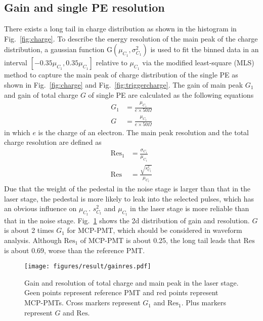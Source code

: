 \subsection{Gain and single PE resolution}
\label{sec:noisegain}
There exists a long tail in charge distribution as shown in the histogram in Fig.~\ref{fig:charge}. To describe the energy resolution of the main peak of the charge distribution, a gaussian function G$(\mu_{C_1},\sigma^2_{C_1})$ is used to fit the binned data in an interval $[-0.35\mu_{C_1}, 0.35\mu_{C_1}]$ relative to $\mu_{C_1}$ via the modified least-square (MLS) method \cite{Cowan1998StatisticalDA} to capture the main peak of charge distribution of the single PE as shown in Fig.~\ref{fig:charge} and Fig.~\ref{fig:triggercharge}. The gain of main peak $G_1$ and gain of total charge $G$ of single PE are calculated as the following equations
\begin{align}
    G_1&=\frac{\mu_{C_1}}{e\times 50\Omega} \\
    G &= \frac{\mu_{C_t}}{e\times 50\Omega}
\end{align}
in which $e$ is the charge of an electron. The main peak resolution and the total charge resolution are defined as
\begin{align}
    \mathrm{Res}_1&=\frac{\sigma_{C_1}}{\mu_{C_1}}\\
    \mathrm{Res}&=\frac{\sqrt{s^2_{C_t}}}{\mu_{C_t}}
\end{align}
Due that the weight of the pedestal in the noise stage is larger than that in the laser stage, the pedestal is more likely to leak into the selected pulses, which has an obvious influence on $\mu_{C_t}$. $s^2_{C_t}$ and $\mu_{C_t}$ in the laser stage is more reliable than that in the noise stage. Fig.~\ref{fig:totalchargeCompare} shows the 2d distribution of gain and resolution.
$G$ is about 2 times $G_1$ for MCP-PMT, which should be considered in waveform analysis. Although $\mathrm{Res}_1$ of MCP-PMT is about 0.25, the long tail leads that $\mathrm{Res}$ is about 0.69, worse than the reference PMT.

\begin{figure}[!htbp]
    \centering
    \texttt{[image: figures/result/gainres.pdf]}
    \caption{Gain and resolution of total charge and main peak in the laser stage. Geen points represent reference PMT and red points represent MCP-PMTs. Cross markers represent $G_1$ and $\mathrm{Res}_1$. Plus markers represent $G$ and $\mathrm{Res}$.}
    \label{fig:totalchargeCompare}
\end{figure}

